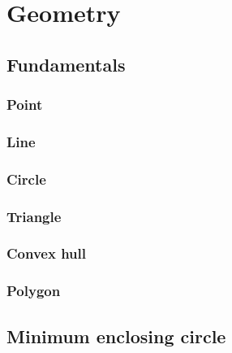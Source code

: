\section{Geometry}

\subsection{Fundamentals}
\subsubsection{Point}

\subsubsection{Line}

\subsubsection{Circle}

\subsubsection{Triangle}

\subsubsection{Convex hull}

\subsubsection{Polygon}

\subsection{Minimum enclosing circle}
